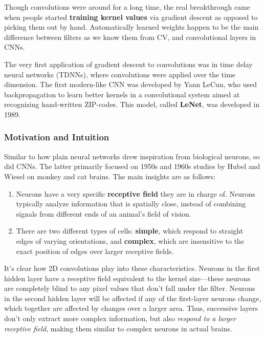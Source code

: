 \documentclass{article}
\begin{document}
Though convolutions were around for a long time, the real breakthrough came when people started \textbf{training kernel values} via gradient descent as opposed to picking them out by hand. Automatically learned weights happen to be the main difference between filters as we know them from CV, and convolutional layers in CNNs.

The very first application of gradient descent to convolutions was in time delay neural networks (TDNNs), where convolutions were applied over the time dimension. The first modern-like CNN was developed by Yann LeCun, who used backpropagation to learn better kernels in a convolutional system aimed at recognizing hand-written ZIP-codes. This model, called \textbf{LeNet}, was developed in 1989.

\subsubsection{Motivation and Intuition}
Similar to how plain neural networks drew inspiration from biological neurons, so did CNNs. The latter primarily focused on 1950s and 1960s studies by Hubel and Wiesel on monkey and cat brains. The main insights are as follows:
\begin{enumerate}
    \item Neurons have a very specific \textbf{receptive field} they are in charge of. Neurons typically analyze information that is spatially close, instead of combining signals from different ends of an animal's field of vision.
    \item There are two different types of cells: \textbf{simple}, which respond to straight edges of varying orientations, and \textbf{complex}, which are insensitive to the exact position of edges over larger receptive fields.
\end{enumerate}
It's clear how 2D convolutions play into these characteristics. Neurons in the first hidden layer have a receptive field equivalent to the kernel size—these neurons are completely blind to any pixel values that don't fall under the filter. Neurons in the second hidden layer will be affected if any of the first-layer neurons change, which together are affected by changes over a larger area. Thus, successive layers don't only extract more complex information, but also \textit{respond to a larger receptive field}, making them similar to complex neurons in actual brains.
\end{document}
